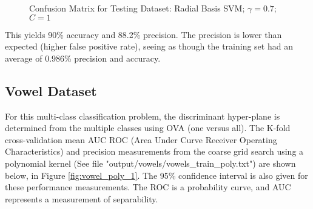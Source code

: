 \documentclass[tikz]{article}
\begin{document}
\begin{figure}[H]
\begin{center}
\caption{Confusion Matrix for Testing Dataset: Radial Basis SVM; $\gamma = 0.7$; $C = 1$}
\label{fig:ion_test}
\end{center}
\end{figure}
This yields 90\% accuracy and 88.2\% precision. The precision is lower than expected (higher false positive rate), seeing as though the training set had an average of 0.986\% precision and accuracy.

\subsection{Vowel Dataset}
\label{sec:vowel}
For this multi-class classification problem, the discriminant hyper-plane is determined from the multiple classes using OVA (one versus all). The K-fold cross-validation mean AUC ROC (Area Under Curve Receiver Operating Characteristics) and precision measurements from the coarse grid search using a polynomial kernel (See file "output/vowels/vowels\_train\_poly.txt") are shown below, in Figure \ref{fig:vowel_poly_1}. The 95\% confidence interval is also given for these performance measurements. The ROC is a probability curve, and AUC represents a measurement of separability.
\end{document}
